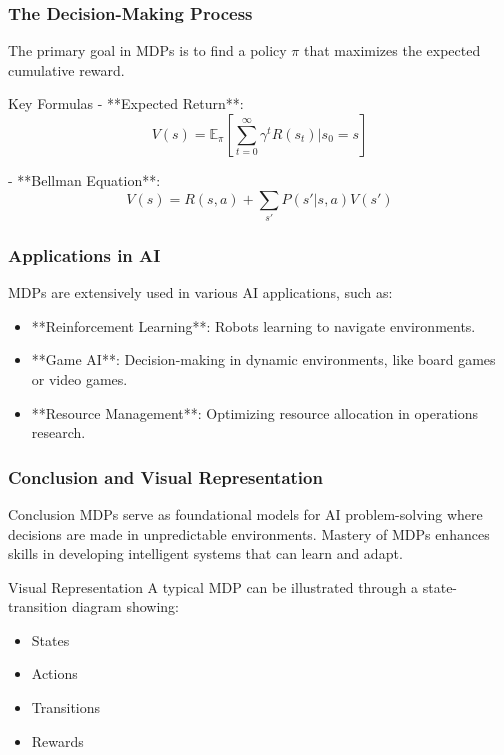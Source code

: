 \documentclass[aspectratio=169]{beamer}
\begin{document}
\begin{frame}[fragile]
    \frametitle{The Decision-Making Process}
    The primary goal in MDPs is to find a policy $\pi$ that maximizes the expected cumulative reward.
    \begin{block}{Key Formulas}
        - **Expected Return**:
        \begin{equation}
            V(s) = \mathbb{E}_\pi \left[ \sum_{t=0}^{\infty} \gamma^t R(s_t) | s_0 = s \right]
        \end{equation}
        
        - **Bellman Equation**:
        \begin{equation}
            V(s) = R(s, a) + \sum_{s'} P(s'|s, a)V(s')
        \end{equation}
    \end{block}
\end{frame}

\begin{frame}[fragile]
    \frametitle{Applications in AI}
    MDPs are extensively used in various AI applications, such as:
    \begin{itemize}
        \item **Reinforcement Learning**: Robots learning to navigate environments.
        \item **Game AI**: Decision-making in dynamic environments, like board games or video games.
        \item **Resource Management**: Optimizing resource allocation in operations research.
    \end{itemize}
\end{frame}

\begin{frame}[fragile]
    \frametitle{Conclusion and Visual Representation}
    \begin{block}{Conclusion}
        MDPs serve as foundational models for AI problem-solving where decisions are made in unpredictable environments. 
        Mastery of MDPs enhances skills in developing intelligent systems that can learn and adapt.
    \end{block}
    \begin{block}{Visual Representation}
        A typical MDP can be illustrated through a state-transition diagram showing:
        \begin{itemize}
            \item States
            \item Actions
            \item Transitions
            \item Rewards
        \end{itemize}
    \end{block}
\end{frame}
\end{document}
